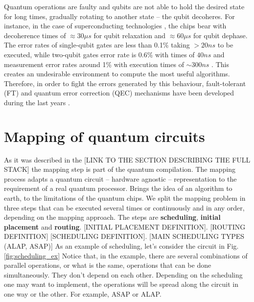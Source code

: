 Quantum operations are faulty and qubits are not able to hold the desired state for long times, gradually rotating to another state -- the qubit decoheres.
For instance, in the case of superconducting technologies \cite{O_Brien_2017}, the chips bear with decoherence times of \(\approx 30 \mu s\) for qubit relaxation and \(\approx 60 \mu s\) for qubit dephase.
The error rates of single-qubit gates are less than 0.1\% taking \(> 20 ns\) to be executed, while two-qubit gates error rate is 0.6\% with times of \(40 ns\) and measurement error rates around 1\% with execution times of \(\sim 300 ns\) \cite{O_Brien_2017,Versluis_2017}.
This creates an undesirable environment to compute the most useful algorithms.
Therefore, in order to fight the errors generated by this behaviour, fault-tolerant (FT) and quantum error correction (QEC) mechanisms have been developed during the last years \cite{Nielsen_2009}.

\section*{Mapping of quantum circuits}
\label{sec:orgfd37431}

As it was described in the [LINK TO THE SECTION DESCRIBING THE FULL STACK] the mapping step is part of the quantum compilation.
The mapping process adapts a quantum circuit -- hardware agnostic -- representation to the requirement of a real quantum processor.
Brings the idea of an algorithm to earth, to the limitations of the quantum chips.
We split the mapping problem in three steps that can be executed several times or continuously and in any order, depending on the mapping approach.
The steps are \textbf{scheduling}, \textbf{initial placement} and \textbf{routing}.
[INITIAL PLACEMENT DEFINITION].
[ROUTING DEFINITION]
[SCHEDULING DEFINITION].
[MAIN SCHEDULING TYPES (ALAP, ASAP)]
As an example of scheduling, let's consider the circuit in Fig. \ref{fig:scheduling_ex}
Notice that, in the example, there are several combinations of parallel operations,
or what is the same, operations that can be done simultaneously.
They don't depend on each other.
Depending on the scheduling one may want to implement,
the operations will be spread along the circuit in one way or the other.
For example, ASAP or ALAP.

